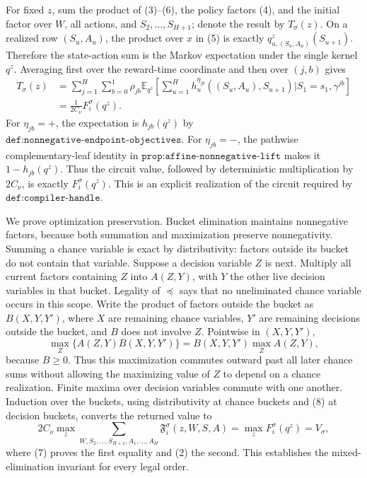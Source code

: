 For fixed \(z\), sum the product of (3)--(6), the policy factors (4), and the initial factor over \(W\), all actions, and \(S_2,\ldots,S_{H+1}\); denote the result by \(T_\sigma(z)\).  On a realized row \((S_u,A_u)\), the product over \(x\) in (5) is exactly \(q^z_{u,(S_u,A_u)}(S_{u+1})\).  Therefore the state-action sum is the Markov expectation under the single kernel \(q^z\).  Averaging first over the reward-time coordinate and then over \((j,b)\) gives
\[
\begin{aligned}
 T_\sigma(z)
 &=\sum_{j=1}^H\sum_{b=0}^1\rho_{jb}
   \mathbb E_{q^z}\!\left[
    \sum_{u=1}^H h_u^{\eta_{jb}}((S_u,A_u),S_{u+1})
    \mathrel{\Big|}S_1=s_1,\gamma^{jb}
   \right]\\
 &=\frac{1}{2C_\nu}F_i^\sigma(q^z).
\end{aligned}
\tag{7}
\]
For \(\eta_{jb}=+\), the expectation is \(h_{jb}(q^z)\) by \(\texttt{def:nonnegative-endpoint-objectives}\).  For \(\eta_{jb}=-\), the pathwise complementary-leaf identity in \(\texttt{prop:affine-nonnegative-lift}\) makes it \(1-h_{jb}(q^z)\).  Thus the circuit value, followed by deterministic multiplication by \(2C_\nu\), is exactly \(F_i^\sigma(q^z)\).  This is an explicit realization of the circuit required by \(\texttt{def:compiler-handle}\).

We prove optimization preservation.  Bucket elimination maintains nonnegative factors, because both summation and maximization preserve nonnegativity.  Summing a chance variable is exact by distributivity: factors outside its bucket do not contain that variable.  Suppose a decision variable \(Z\) is next.  Multiply all current factors containing \(Z\) into \(A(Z,Y)\), with \(Y\) the other live decision variables in that bucket.  Legality of \(\preceq\) says that no uneliminated chance variable occurs in this scope.  Write the product of factors outside the bucket as \(B(X,Y,Y')\), where \(X\) are remaining chance variables, \(Y'\) are remaining decisions outside the bucket, and \(B\) does not involve \(Z\).  Pointwise in \((X,Y,Y')\),
\[
 \max_Z\{A(Z,Y)B(X,Y,Y')\}
 =B(X,Y,Y')\max_ZA(Z,Y),
 \tag{8}
\]
because \(B\ge0\).  Thus this maximization commutes outward past all later chance sums without allowing the maximizing value of \(Z\) to depend on a chance realization.  Finite maxima over decision variables commute with one another.  Induction over the buckets, using distributivity at chance buckets and (8) at decision buckets, converts the returned value to
\[
 2C_\nu\max_z
 \sum_{W,S_2,\ldots,S_{H+1},A_1,\ldots,A_H}
 \mathfrak F_i^\sigma(z,W,S,A)
 =\max_zF_i^\sigma(q^z)=V_\sigma,
 \tag{9}
\]
where (7) proves the first equality and (2) the second.  This establishes the mixed-elimination invariant for every legal order.

